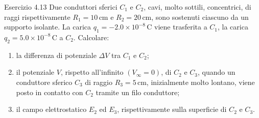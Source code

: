 \documentclass[a4paper]{article}
\begin{document}
\begin{snippetexercise}{Esercizio 4.13}
    Due conduttori sferici \(C_1\) e \(C_2\), cavi, molto sottili,
    concentrici, di raggi rispettivamente
    \(R_1 = 10\,\mathrm{cm}\) e \(R_2 = 20\,\mathrm{cm}\), sono sostenuti
    ciascuno da un supporto isolante. La carica
    \(q_1 = -2.0 \times 10^{-8}\,\mathrm{C}\) viene trasferita a \(C_1\),
    la carica \(q_2 = 5.0 \times 10^{-8}\,\mathrm{C}\) a \(C_2\).
    Calcolare:
    \begin{enumerate}[nosep]
        \item la differenza di potenziale \(\Delta V\) tra \(C_1\) e \(C_2\);
        \item il potenziale \(V\), rispetto all'infinito \((V_{\infty}=0)\),
        di \(C_2\) e \(C_3\), quando un conduttore sferico \(C_3\) di raggio
        \(R_3 = 5\,\mathrm{cm}\), inizialmente molto lontano, viene posto in
        contatto con \(C_2\) tramite un filo conduttore;
        \item il campo elettrostatico \(E_2\) ed \(E_3\), rispettivamente sulla
        superficie di \(C_2\) e \(C_3\).
    \end{enumerate}
\end{snippetexercise}
\end{document}
